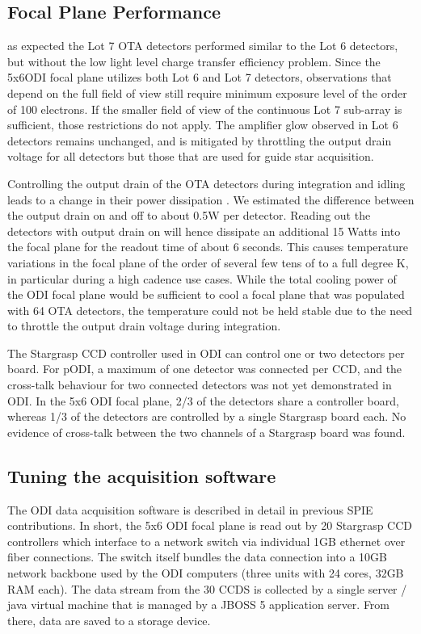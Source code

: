 \documentclass[]{spieman}
\begin{document}
\subsection{Focal Plane  Performance}

as expected the Lot 7 OTA detectors performed similar to the Lot 6 detectors, but without the 
low light level charge transfer efficiency problem. Since the 5x6ODI focal plane  utilizes  both 
Lot 6 and Lot 7 detectors, observations that depend on the full field of view still
require minimum exposure level of the order of 100 electrons. If the smaller field of view of
the continuous Lot 7 sub-array is sufficient, those restrictions do not apply. The amplifier glow
observed in Lot 6 detectors remains unchanged, and is mitigated by throttling  the output drain 
voltage for all detectors but those that are used for guide star acquisition.

Controlling the output drain of the OTA detectors during integration and idling leads to a change 
in their power dissipation . We estimated the  difference between the
output drain on and off to about 0.5W per detector. Reading out the detectors with output drain on
will hence dissipate an additional 15 Watts into the focal plane for the readout time of about 6 seconds. 
This causes temperature variations in the focal plane of the order of several  few tens of to a full degree K, in
particular during a high cadence use cases. While the total cooling power of the
ODI focal plane would be sufficient to cool a focal plane that was populated with 64 OTA detectors, 
the temperature could not be held stable due to the need to throttle the output drain voltage during integration.


The Stargrasp CCD controller\cite{Onaka2008} used in ODI can control one or two detectors per board. For
pODI, a maximum of one detector was connected per CCD, and the cross-talk behaviour for two connected detectors was 
not yet demonstrated in ODI. In the 5x6 ODI focal plane, 2/3 of the detectors share a controller board, whereas 1/3
of the detectors are controlled by a single Stargrasp board each. No evidence of cross-talk between the two channels 
of a Stargrasp board was found. 



\subsection{Tuning the acquisition software}

The ODI data acquisition software is described in detail in previous SPIE
 contributions\cite{Yeatts2008,Yeatts2010}.
In short, the 5x6 ODI focal plane is read out by 20 Stargrasp CCD controllers which
interface to a network switch via individual  1GB ethernet over fiber
connections. The switch itself bundles the data connection into a 10GB network
backbone used by the ODI computers (three units with 24 cores, 32GB RAM each). The 
data stream from the 30 CCDS is collected by a single server / java virtual machine that is
managed by a JBOSS 5 application server. From there, data are saved to a storage device. 
\end{document}
